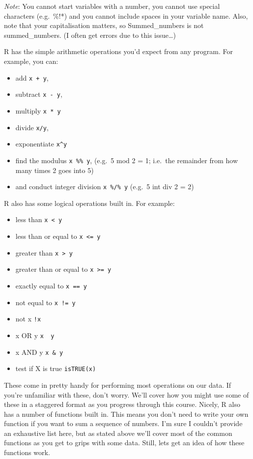 \documentclass[
]{book}
\providecommand{\tightlist}{%
  \setlength{\itemsep}{0pt}\setlength{\parskip}{0pt}}
\begin{document}
\emph{Note}: You cannot start variables with a number, you cannot use special characters (e.g.~\%!*) and you cannot include spaces in your variable name. Also, note that your capitalisation matters, so Summed\_numbers is not summed\_numbers. (I often get errors due to this issue\ldots)

R has the simple arithmetic operations you'd expect from any program. For example, you can:

\begin{itemize}
\tightlist
\item
  add \texttt{x\ +\ y},
\item
  subtract \texttt{x\ -\ y},
\item
  multiply \texttt{x\ *\ y}
\item
  divide \texttt{x/y},
\item
  exponentiate \texttt{x\^{}y}
\item
  find the modulus \texttt{x\ \%\%\ y}, (e.g.~5 mod 2 = 1; i.e.~the remainder from how many times 2 goes into 5)
\item
  and conduct integer division \texttt{x\ \%/\%\ y} (e.g.~5 int div 2 = 2)
\end{itemize}

R also has some logical operations built in. For example:

\begin{itemize}
\tightlist
\item
  less than \texttt{x\ \textless{}\ y}
\item
  less than or equal to \texttt{x\ \textless{}=\ y}
\item
  greater than \texttt{x\ \textgreater{}\ y}
\item
  greater than or equal to \texttt{x\ \textgreater{}=\ y}
\item
  exactly equal to \texttt{x\ ==\ y}
\item
  not equal to \texttt{x\ !=\ y}
\item
  not x \texttt{!x}
\item
  x OR y \texttt{x\ \textbar{}\ y}
\item
  x AND y \texttt{x\ \&\ y}
\item
  test if X is true \texttt{isTRUE(x)}
\end{itemize}

These come in pretty handy for performing most operations on our data. If you're unfamiliar with these, don't worry. We'll cover how you might use some of these in a staggered format as you progress through this course. Nicely, R also has a number of functions built in. This means you don't need to write your own function if you want to sum a sequence of numbers. I'm sure I couldn't provide an exhaustive list here, but as stated above we'll cover most of the common functions as you get to grips with some data. Still, lets get an idea of how these functions work.
\end{document}
